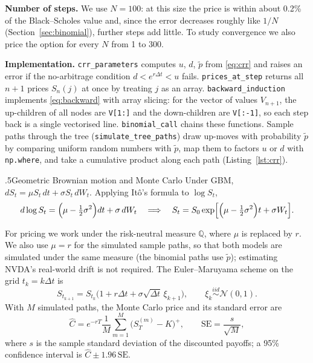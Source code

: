 \documentclass[12pt]{amsart}
\makeatletter
\def\subsection{\@startsection{subsection}{2}{\z@}{.7\linespacing\@plus\linespacing}%
  {.5\linespacing}{\normalfont\bfseries}}
\newcommand{\Q}{\mathbb{Q}}
\newcommand{\N}{\mathcal{N}}
\makeatother
\begin{document}
\noindent\textbf{Number of steps.} We use $N=100$: at this size the price is within about 0.2\%
of the Black--Scholes value and, since the error decreases roughly like $1/N$
(Section~\ref{sec:binomial}), further steps add little. To study convergence we also price the
option for every $N$ from 1 to 300.

\noindent\textbf{Implementation.} \texttt{crr\_parameters} computes $u$, $d$, $\tilde p$ from
\eqref{eq:crr} and raises an error if the no-arbitrage condition $d<e^{r\Delta t}<u$ fails.
\texttt{prices\_at\_step} returns all $n+1$ prices $S_n(j)$ at once by treating $j$ as an array.
\texttt{backward\_induction} implements \eqref{eq:backward} with array slicing: for the vector
of values $V_{n+1}$, the up-children of all nodes are \texttt{V[1:]} and the down-children are
\texttt{V[:-1]}, so each step back is a single vectorised line. \texttt{binomial\_call} chains
these functions. Sample paths through the tree (\texttt{simulate\_tree\_paths}) draw up-moves
with probability $\tilde p$ by comparing uniform random numbers with $\tilde p$, map them to
factors $u$ or $d$ with \texttt{np.where}, and take a cumulative product along each path
(Listing~\ref{lst:crr}).

\subsection{Geometric Brownian motion and Monte Carlo}\label{sec:gbm}
Under GBM, $dS_t=\mu S_t\,dt+\sigma S_t\,dW_t$. Applying It\^o's formula to $\log S_t$,
\[
d\log S_t=\Bigl(\mu-\tfrac12\sigma^2\Bigr)dt+\sigma\,dW_t
\quad\Longrightarrow\quad
S_t=S_0\exp\Bigl[\Bigl(\mu-\tfrac12\sigma^2\Bigr)t+\sigma W_t\Bigr].
\]

For pricing we work under the risk-neutral measure $\Q$, where $\mu$ is replaced by $r$.
We also use $\mu=r$ for the simulated sample paths, so that both models are simulated under the
same measure (the binomial paths use $\tilde p$); estimating NVDA's real-world drift is not required.
The Euler--Maruyama scheme on the grid $t_k=k\Delta t$ is
\begin{equation}\label{eq:euler}
S_{t_{k+1}} = S_{t_k}\bigl(1+r\Delta t+\sigma\sqrt{\Delta t}\,\xi_{k+1}\bigr),\qquad \xi_k\overset{iid}{\sim}\N(0,1).
\end{equation}
With $M$ simulated paths, the Monte Carlo price and its standard error are
\begin{equation}\label{eq:mc}
\widehat C = e^{-rT}\frac1M\sum_{m=1}^M \bigl(S_T^{(m)}-K\bigr)^+,\qquad
\mathrm{SE}=\frac{s}{\sqrt M},
\end{equation}
where $s$ is the sample standard deviation of the discounted payoffs; a 95\% confidence interval is $\widehat C\pm1.96\,\mathrm{SE}$.
\end{document}
